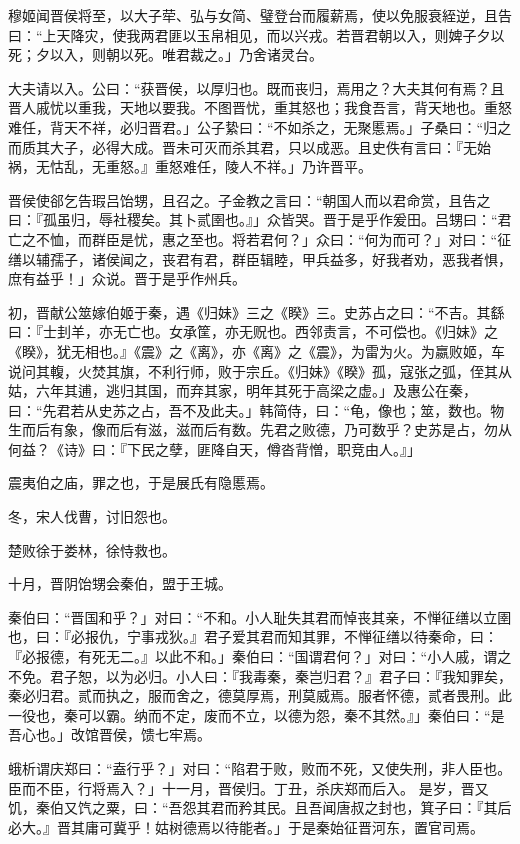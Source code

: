 \documentclass[]{article}
\begin{document}
穆姬闻晋侯将至，以大子荦、弘与女简、璧登台而履薪焉，使以免服衰絰逆，且告曰：``上天降灾，使我两君匪以玉帛相见，而以兴戎。若晋君朝以入，则婢子夕以死；夕以入，则朝以死。唯君裁之。」乃舍诸灵台。

大夫请以入。公曰：``获晋侯，以厚归也。既而丧归，焉用之？大夫其何有焉？且晋人戚忧以重我，天地以要我。不图晋忧，重其怒也；我食吾言，背天地也。重怒难任，背天不祥，必归晋君。」公子絷曰：``不如杀之，无聚慝焉。」子桑曰：``归之而质其大子，必得大成。晋未可灭而杀其君，只以成恶。且史佚有言曰：『无始祸，无怙乱，无重怒。』重怒难任，陵人不祥。」乃许晋平。

晋侯使郤乞告瑕吕饴甥，且召之。子金教之言曰：``朝国人而以君命赏，且告之曰：『孤虽归，辱社稷矣。其卜贰圉也。』」众皆哭。晋于是乎作爰田。吕甥曰：``君亡之不恤，而群臣是忧，惠之至也。将若君何？」众曰：``何为而可？」对曰：``征缮以辅孺子，诸侯闻之，丧君有君，群臣辑睦，甲兵益多，好我者劝，恶我者惧，庶有益乎！」众说。晋于是乎作州兵。

初，晋献公筮嫁伯姬于秦，遇《归妹》三之《睽》三。史苏占之曰：``不吉。其繇曰：『士刲羊，亦无亡也。女承筐，亦无贶也。西邻责言，不可偿也。《归妹》之《睽》，犹无相也。』《震》之《离》，亦《离》之《震》，为雷为火。为嬴败姬，车说问其輹，火焚其旗，不利行师，败于宗丘。《归妹》《睽》孤，寇张之弧，侄其从姑，六年其逋，逃归其国，而弃其家，明年其死于高梁之虚。」及惠公在秦，曰：``先君若从史苏之占，吾不及此夫。」韩简侍，曰：``龟，像也；筮，数也。物生而后有象，像而后有滋，滋而后有数。先君之败德，乃可数乎？史苏是占，勿从何益？《诗》曰：『下民之孽，匪降自天，僔沓背憎，职竞由人。』」

震夷伯之庙，罪之也，于是展氏有隐慝焉。

冬，宋人伐曹，讨旧怨也。

楚败徐于娄林，徐恃救也。

十月，晋阴饴甥会秦伯，盟于王城。

秦伯曰：``晋国和乎？」对曰：``不和。小人耻失其君而悼丧其亲，不惮征缮以立圉也，曰：『必报仇，宁事戎狄。』君子爱其君而知其罪，不惮征缮以待秦命，曰：『必报德，有死无二。』以此不和。」秦伯曰：``国谓君何？」对曰：``小人戚，谓之不免。君子恕，以为必归。小人曰：『我毒秦，秦岂归君？』君子曰：『我知罪矣，秦必归君。贰而执之，服而舍之，德莫厚焉，刑莫威焉。服者怀德，贰者畏刑。此一役也，秦可以霸。纳而不定，废而不立，以德为怨，秦不其然。』」秦伯曰：``是吾心也。」改馆晋侯，馈七牢焉。

蛾析谓庆郑曰：``盍行乎？」对曰：``陷君于败，败而不死，又使失刑，非人臣也。臣而不臣，行将焉入？」十一月，晋侯归。丁丑，杀庆郑而后入。
是岁，晋又饥，秦伯又饩之粟，曰：``吾怨其君而矜其民。且吾闻唐叔之封也，箕子曰：『其后必大。』晋其庸可冀乎！姑树德焉以待能者。」于是秦始征晋河东，置官司焉。
\end{document}
